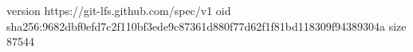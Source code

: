 version https://git-lfs.github.com/spec/v1
oid sha256:9682dbf0efd7c2f110bf3ede9c87361d880f77d62f1f81bd118309f94389304a
size 87544
